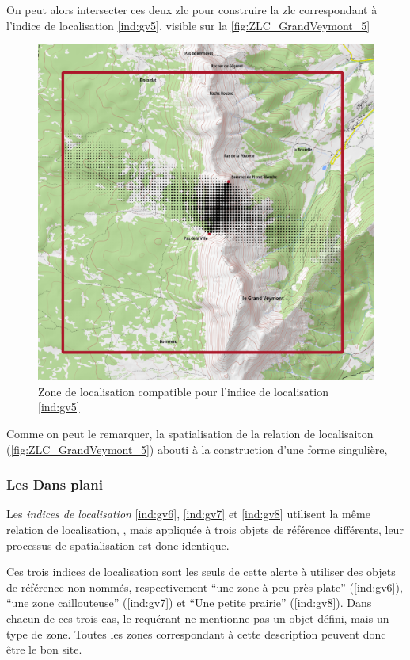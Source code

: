 On peut alors intersecter ces deux \ac{zlc} pour construire la
\ac{zlc} correspondant à l'indice de localisation \ref{ind:gv5},
visible sur la \autoref{fig:ZLC_GrandVeymont_5}

\begin{figure}
  \centering
  \includegraphics{../figures/EntreGrandVeymont.png}
  \caption{Zone de localisation compatible pour l'indice de
    localisation \ref{ind:gv5}}
  \label{fig:ZLC_GrandVeymont_5}
\end{figure}

Comme on peut le remarquer, la spatialisation de la relation de
localisaiton 
(\autoref{fig:ZLC_GrandVeymont_5}) abouti à la construction d'une
forme singulière, 

\subsubsection{Les Dans plani}

Les \emph{indices de localisation} \ref{ind:gv6}, \ref{ind:gv7} et
\ref{ind:gv8} utilisent la même relation de localisation,
, mais appliquée à trois objets de
référence différents, leur processus de spatialisation est donc
identique.

Ces trois indices de localisation sont les seuls de cette alerte à
utiliser des objets de référence non nommés, respectivement
\enquote{une zone à peu près plate} (\ref{ind:gv6}), \enquote{une zone
  caillouteuse} (\ref{ind:gv7}) et \enquote{Une petite prairie}
(\ref{ind:gv8}). Dans chacun de ces trois cas, le requérant ne
mentionne pas un objet défini, mais un type de zone. Toutes les zones
correspondant à cette description peuvent donc être le bon site.

